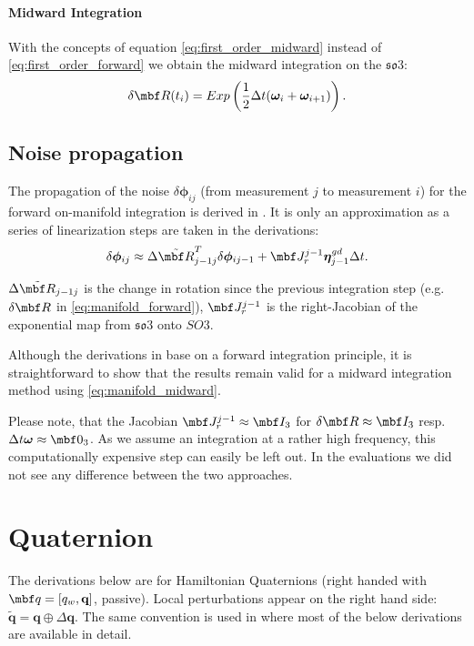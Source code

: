 \documentclass[10pt,a4paper]{article}
\newcommand{\mbs}[1]{{\boldsymbol{#1}}}
\numberwithin{equation}{section}
\begin{document}
\paragraph{Midward Integration}
With the concepts of equation \eqref{eq:first_order_midward} instead of \eqref{eq:first_order_forward} we obtain the midward integration on the $\mathfrak{so}3$:
\begin{equation}
\delta \mbf R(t_i) = Exp \left( \dfrac{1}{2}\Delta t (\mbs \omega_i + \mbs \omega_{i+1})\right).
\label{eq:manifold_midward}
\end{equation}

\subsection{Noise propagation}
The propagation of the noise $\delta \mbs \phi_{ij}$ (from measurement $j$ to measurement $i$) for the forward on-manifold integration is derived in \cite{forster}. It is only an approximation as a series of linearization steps are taken in the derivations:
\begin{equation}
\delta \mbs \phi_{ij} \approx \Delta \tilde{\mbf R}_{j-1j}^T\delta \mbs \phi_{ij-1} + \mbf J_{r}^{j-1} \mbs \eta_{j-1}^{gd}\Delta t.
\label{eq:manifold_backward}
\end{equation}

$\Delta \tilde{\mbf R}_{j-1j}$ is the change in rotation since the previous integration step (e.g. $\delta \mbf R$ in \eqref{eq:manifold_forward}), $\mbf J_{r}^{j-1}$ is the right-Jacobian of the exponential map from $\mathfrak{so}3$ onto $SO3$.

Although the derivations in \cite{forster} base on a forward integration principle, it is straightforward to show that the results remain valid for a midward integration method using \eqref{eq:manifold_midward}.

Please note, that the Jacobian $\mbf J_{r}^{j-1} \approx \mbf I_3$ for $\delta \mbf R \approx \mbf I_3$ resp. $\Delta t \mbs \omega\approx \mbf 0_3$. As we assume an integration at a rather high frequency, this computationally expensive step can easily be left out. In the evaluations we did not see any difference between the two approaches.

\section{Quaternion}

The derivations below are for Hamiltonian Quaternions (right handed with $\mbf q = \left[ q_w , \textbf{q} \right]$, passive).
Local perturbations appear on the right hand side: $\tilde{\textbf{q}} = \textbf{q}\oplus \Delta \textbf{q}$.
The same convention is used in \cite{joan_sola} where most of the below derivations are available in detail.
\end{document}
